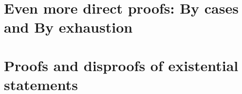\section[By cases and By exhaustion]{Even more direct proofs: By cases and By exhaustion}





\newpage

\section[Existential statements]{Proofs and disproofs of existential statements}






%
%

 
